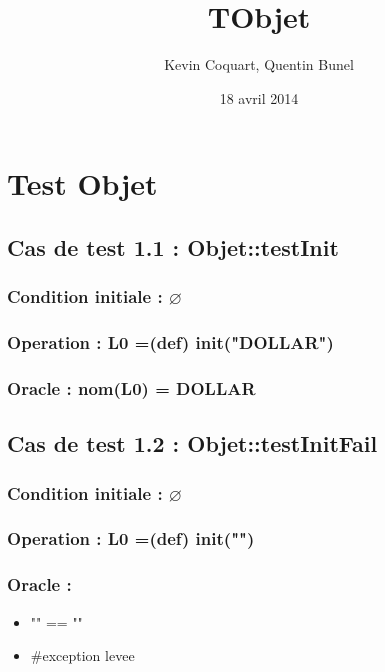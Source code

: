 \documentclass[11pt]{article}
\title{TObjet}
\author{Kevin Coquart, Quentin Bunel}
\date{18 avril 2014}
\begin{document}
\maketitle

\setcounter{tocdepth}{3}
\tableofcontents
\vspace*{1cm}
\section{Test Objet}
\label{sec-1}


\subsection{Cas de test 1.1 : Objet::testInit}
\label{sec-1.1}

\subsubsection{Condition initiale : $\varnothing$}
\label{sec-1.1.1}

\subsubsection{Operation : L0 =(def) init("DOLLAR")}
\label{sec-1.1.2}

\subsubsection{Oracle : nom(L0) = DOLLAR}
\label{sec-1.1.3}


\subsection{Cas de test 1.2 : Objet::testInitFail}
\label{sec-1.2}

\subsubsection{Condition initiale : $\varnothing$}
\label{sec-1.2.1}

\subsubsection{Operation : L0 =(def) init("")}
\label{sec-1.2.2}

\subsubsection{Oracle :}
\label{sec-1.2.3}

\begin{itemize}

\item "" == ""\\
\label{sec-1.2.3.1}


\item \#exception levee\\
\label{sec-1.2.3.2}

\end{itemize} %
\end{document}
